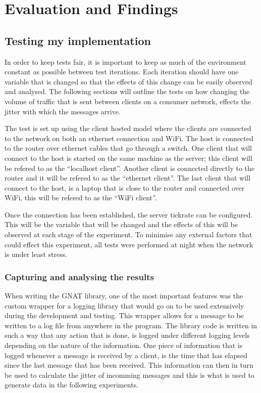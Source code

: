 \chapter{Evaluation and Findings}



\section{Testing my implementation} \label{sec:testing}
In order to keep tests fair, it is important to keep as much of the environment constant as possible between test iterations. Each iteration should have one variable that is changed so that the effects of this change can be easily observed and analysed. The following sections will outline the tests on how changing the volume of traffic that is sent between clients on a consumer network, effects the jitter with which the messages arrive.

The test is set up using the client hosted model where the clients are connected to the network on both an ethernet connection and WiFi. The host is connected to the router over ethernet cables that go through a switch. One client that will connect to the host is started on the same machine as the server; this client will be refered to as the ``localhost client''. Another client is connected directly to the router and it will be refered to as the ``ethernet client''. The last client that will connect to the host, is a laptop that is close to the router and connected over WiFi, this will be refered to as the ``WiFi client''.

Once the connection has been established, the server tickrate can be configured. This will be the variable that will be changed and the effects of this will be observed at each stage of the experiment. To minimise any external factors that could effect this experiment, all tests were performed at night when the network is under least stress.

\subsection{Capturing and analysing the results}
When writing the GNAT library, one of the most important features was the custom wrapper for a logging library that would go on to be used extensively during the development and testing. This wrapper allows for a message to be written to a log file from anywhere in the program. The library code is written in such a way that any action that is done, is logged under different logging levels depending on the nature of the information. One piece of information that is logged whenever a message is received by a client, is the time that has elapsed since the last message that has been received. This information can then in turn be used to calculate the jitter of incomming messages and this is what is used to generate data in the following experiments.

